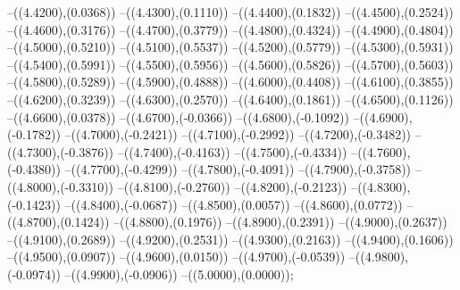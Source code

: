 {	--({\sx*(4.4200)},{\sy*(0.0368)})
	--({\sx*(4.4300)},{\sy*(0.1110)})
	--({\sx*(4.4400)},{\sy*(0.1832)})
	--({\sx*(4.4500)},{\sy*(0.2524)})
	--({\sx*(4.4600)},{\sy*(0.3176)})
	--({\sx*(4.4700)},{\sy*(0.3779)})
	--({\sx*(4.4800)},{\sy*(0.4324)})
	--({\sx*(4.4900)},{\sy*(0.4804)})
	--({\sx*(4.5000)},{\sy*(0.5210)})
	--({\sx*(4.5100)},{\sy*(0.5537)})
	--({\sx*(4.5200)},{\sy*(0.5779)})
	--({\sx*(4.5300)},{\sy*(0.5931)})
	--({\sx*(4.5400)},{\sy*(0.5991)})
	--({\sx*(4.5500)},{\sy*(0.5956)})
	--({\sx*(4.5600)},{\sy*(0.5826)})
	--({\sx*(4.5700)},{\sy*(0.5603)})
	--({\sx*(4.5800)},{\sy*(0.5289)})
	--({\sx*(4.5900)},{\sy*(0.4888)})
	--({\sx*(4.6000)},{\sy*(0.4408)})
	--({\sx*(4.6100)},{\sy*(0.3855)})
	--({\sx*(4.6200)},{\sy*(0.3239)})
	--({\sx*(4.6300)},{\sy*(0.2570)})
	--({\sx*(4.6400)},{\sy*(0.1861)})
	--({\sx*(4.6500)},{\sy*(0.1126)})
	--({\sx*(4.6600)},{\sy*(0.0378)})
	--({\sx*(4.6700)},{\sy*(-0.0366)})
	--({\sx*(4.6800)},{\sy*(-0.1092)})
	--({\sx*(4.6900)},{\sy*(-0.1782)})
	--({\sx*(4.7000)},{\sy*(-0.2421)})
	--({\sx*(4.7100)},{\sy*(-0.2992)})
	--({\sx*(4.7200)},{\sy*(-0.3482)})
	--({\sx*(4.7300)},{\sy*(-0.3876)})
	--({\sx*(4.7400)},{\sy*(-0.4163)})
	--({\sx*(4.7500)},{\sy*(-0.4334)})
	--({\sx*(4.7600)},{\sy*(-0.4380)})
	--({\sx*(4.7700)},{\sy*(-0.4299)})
	--({\sx*(4.7800)},{\sy*(-0.4091)})
	--({\sx*(4.7900)},{\sy*(-0.3758)})
	--({\sx*(4.8000)},{\sy*(-0.3310)})
	--({\sx*(4.8100)},{\sy*(-0.2760)})
	--({\sx*(4.8200)},{\sy*(-0.2123)})
	--({\sx*(4.8300)},{\sy*(-0.1423)})
	--({\sx*(4.8400)},{\sy*(-0.0687)})
	--({\sx*(4.8500)},{\sy*(0.0057)})
	--({\sx*(4.8600)},{\sy*(0.0772)})
	--({\sx*(4.8700)},{\sy*(0.1424)})
	--({\sx*(4.8800)},{\sy*(0.1976)})
	--({\sx*(4.8900)},{\sy*(0.2391)})
	--({\sx*(4.9000)},{\sy*(0.2637)})
	--({\sx*(4.9100)},{\sy*(0.2689)})
	--({\sx*(4.9200)},{\sy*(0.2531)})
	--({\sx*(4.9300)},{\sy*(0.2163)})
	--({\sx*(4.9400)},{\sy*(0.1606)})
	--({\sx*(4.9500)},{\sy*(0.0907)})
	--({\sx*(4.9600)},{\sy*(0.0150)})
	--({\sx*(4.9700)},{\sy*(-0.0539)})
	--({\sx*(4.9800)},{\sy*(-0.0974)})
	--({\sx*(4.9900)},{\sy*(-0.0906)})
	--({\sx*(5.0000)},{\sy*(0.0000)});
}
